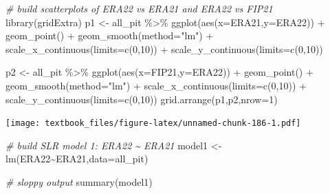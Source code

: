 \documentclass[
  11pt,
]{book}
\newenvironment{Shaded}{\begin{snugshade}}{\end{snugshade}}
\newcommand{\AttributeTok}[1]{\textcolor[rgb]{0.77,0.63,0.00}{#1}}
\newcommand{\CommentTok}[1]{\textcolor[rgb]{0.56,0.35,0.01}{\textit{#1}}}
\newcommand{\DecValTok}[1]{\textcolor[rgb]{0.00,0.00,0.81}{#1}}
\newcommand{\FunctionTok}[1]{\textcolor[rgb]{0.00,0.00,0.00}{#1}}
\newcommand{\NormalTok}[1]{#1}
\newcommand{\OtherTok}[1]{\textcolor[rgb]{0.56,0.35,0.01}{#1}}
\newcommand{\SpecialCharTok}[1]{\textcolor[rgb]{0.00,0.00,0.00}{#1}}
\newcommand{\StringTok}[1]{\textcolor[rgb]{0.31,0.60,0.02}{#1}}
\theoremstyle{definition}
\theoremstyle{definition}
\theoremstyle{definition}
\theoremstyle{definition}
\theoremstyle{remark}
\begin{document}
\begin{Shaded}
\begin{Highlighting}[]
\CommentTok{\# build scatterplots of ERA22 vs ERA21 and ERA22 vs FIP21}
\FunctionTok{library}\NormalTok{(gridExtra)}
\NormalTok{p1 }\OtherTok{\textless{}{-}}\NormalTok{ all\_pit }\SpecialCharTok{\%\textgreater{}\%} \FunctionTok{ggplot}\NormalTok{(}\FunctionTok{aes}\NormalTok{(}\AttributeTok{x=}\NormalTok{ERA21,}\AttributeTok{y=}\NormalTok{ERA22)) }\SpecialCharTok{+}
  \FunctionTok{geom\_point}\NormalTok{() }\SpecialCharTok{+}
  \FunctionTok{geom\_smooth}\NormalTok{(}\AttributeTok{method=}\StringTok{"lm"}\NormalTok{) }\SpecialCharTok{+}
  \FunctionTok{scale\_x\_continuous}\NormalTok{(}\AttributeTok{limits=}\FunctionTok{c}\NormalTok{(}\DecValTok{0}\NormalTok{,}\DecValTok{10}\NormalTok{)) }\SpecialCharTok{+}
  \FunctionTok{scale\_y\_continuous}\NormalTok{(}\AttributeTok{limits=}\FunctionTok{c}\NormalTok{(}\DecValTok{0}\NormalTok{,}\DecValTok{10}\NormalTok{))}

\NormalTok{p2 }\OtherTok{\textless{}{-}}\NormalTok{ all\_pit }\SpecialCharTok{\%\textgreater{}\%} \FunctionTok{ggplot}\NormalTok{(}\FunctionTok{aes}\NormalTok{(}\AttributeTok{x=}\NormalTok{FIP21,}\AttributeTok{y=}\NormalTok{ERA22)) }\SpecialCharTok{+}
  \FunctionTok{geom\_point}\NormalTok{() }\SpecialCharTok{+}
  \FunctionTok{geom\_smooth}\NormalTok{(}\AttributeTok{method=}\StringTok{"lm"}\NormalTok{) }\SpecialCharTok{+}
  \FunctionTok{scale\_x\_continuous}\NormalTok{(}\AttributeTok{limits=}\FunctionTok{c}\NormalTok{(}\DecValTok{0}\NormalTok{,}\DecValTok{10}\NormalTok{)) }\SpecialCharTok{+}
  \FunctionTok{scale\_y\_continuous}\NormalTok{(}\AttributeTok{limits=}\FunctionTok{c}\NormalTok{(}\DecValTok{0}\NormalTok{,}\DecValTok{10}\NormalTok{))}
\FunctionTok{grid.arrange}\NormalTok{(p1,p2,}\AttributeTok{nrow=}\DecValTok{1}\NormalTok{)}
\end{Highlighting}
\end{Shaded}

\texttt{[image: textbook\_files/figure-latex/unnamed-chunk-186-1.pdf]}

\newpage

\begin{Shaded}
\begin{Highlighting}[]
\CommentTok{\# build SLR model 1: ERA22 \textasciitilde{} ERA21}
\NormalTok{model1 }\OtherTok{\textless{}{-}} \FunctionTok{lm}\NormalTok{(ERA22}\SpecialCharTok{\textasciitilde{}}\NormalTok{ERA21,}\AttributeTok{data=}\NormalTok{all\_pit)}

\CommentTok{\# sloppy output}
\FunctionTok{summary}\NormalTok{(model1)}
\end{Highlighting}
\end{Shaded}
\end{document}

